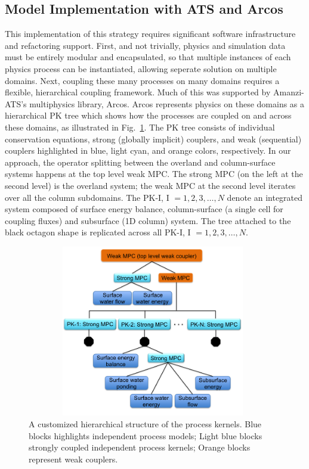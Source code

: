 \documentclass[review,11pt]{elsarticle}
\begin{document}
\subsection{Model Implementation with ATS and Arcos}
This implementation of this strategy requires significant software infrastructure and refactoring support.
First, and not trivially, physics and simulation data must be entirely modular and encapsulated, so that multiple instances of each physics process can be instantiated, allowing seperate solution on multiple domains.
Next, coupling these many processes on many domains requires a flexible, hierarchical coupling framework.
Much of this was supported by Amanzi-ATS's multiphysics library, Arcos\cite{ecoon2016managing}.
Arcos represents physics on these domains as a hierarchical PK tree which shows how the processes are coupled on and across these domains, as illustrated in Fig.~\ref{pk-tree}.
The PK tree consists of individual conservation equations, strong (globally implicit) couplers, and weak (sequential) couplers highlighted in blue, light cyan, and orange colors, respectively.
In our approach, the operator splitting between the overland and column-surface systems happens at the top level weak MPC.
The strong MPC (on the left at the second level) is the overland system; the weak MPC at the second level iterates over all the column subdomains.
The PK-I, I $=1,2,3, \dots, N$ denote an integrated system composed of surface energy balance, column-surface (a single cell for coupling fluxes) and subsurface (1D column) system.
The tree attached to the black octagon shape is replicated across all PK-I, I $=1,2,3, \dots, N$.
%
\begin{figure}[!htpb]
\centering
\includegraphics[height = 7.5cm, width=11cm]{figures/process-tree1.png}
\caption{A customized hierarchical structure of the process kernels. Blue blocks highlights independent process models; Light blue blocks strongly coupled independent process kernels; Orange blocks represent weak couplers.}
\label{pk-tree}
\end{figure}
\end{document}
